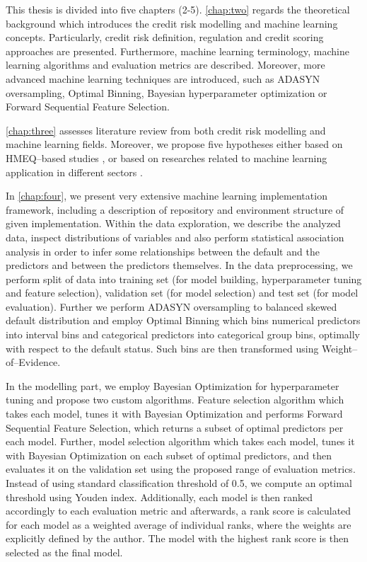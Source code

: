 This thesis is divided into five chapters (2-5).  \autoref{chap:two} regards the theoretical background which introduces the credit risk modelling and machine learning concepts. Particularly, credit risk definition, regulation and credit scoring approaches are presented.
Furthermore, machine learning terminology, machine learning algorithms and evaluation metrics are described.
Moreover, more advanced machine learning techniques are introduced, such as ADASYN oversampling, Optimal Binning, Bayesian hyperparameter optimization or Forward Sequential Feature Selection.

\autoref{chap:three} assesses literature review from both credit risk modelling and machine learning fields. Moreover, we propose five hypotheses either based on HMEQ--based studies \citep{serkan2021bagging, zurada2014classification}, or based on researches related to machine learning application in different sectors \citep{de2023predicting, pintelas2020grey, wu2018accurate}.

In \autoref{chap:four}, we present very extensive machine learning implementation framework, including a description of repository and environment structure of given implementation. Within the data exploration, we describe the analyzed data, inspect distributions of variables and also perform statistical association analysis in order to infer some relationships between the default and the predictors and between the predictors themselves.
In the data preprocessing, we perform split of data into training set (for model building, hyperparameter tuning and feature selection), validation set (for model selection) and test set (for model evaluation).
Further we perform ADASYN oversampling to balanced skewed default distribution and employ Optimal Binning which bins numerical predictors into interval bins and categorical predictors into categorical group bins, optimally with respect to the default status. Such bins are then transformed using Weight--of--Evidence.

In the modelling part, we employ Bayesian Optimization for hyperparameter tuning and propose two custom algorithms. Feature selection algorithm which takes each model, tunes it with Bayesian Optimization and performs Forward Sequential Feature Selection, which returns a subset of optimal predictors per each model.
Further, model selection algorithm which takes each model, tunes it with Bayesian Optimization on each subset of optimal predictors, and then evaluates it on the validation set using the proposed range of evaluation metrics. Instead of using standard classification threshold of 0.5, we compute an optimal threshold using Youden index.
Additionally, each model is then ranked accordingly to each evaluation metric and afterwards, a rank score is calculated for each model as a weighted average of individual ranks, where the weights are explicitly defined by the author. The model with the highest rank score is then selected as the final model.

